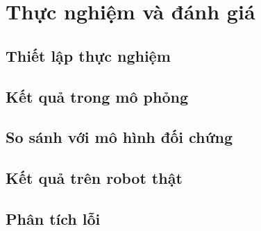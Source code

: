 \section{Thực nghiệm và đánh giá}
\label{sec:experiments}

\subsection{Thiết lập thực nghiệm}

\subsection{Kết quả trong mô phỏng}

\subsection{So sánh với mô hình đối chứng}

\subsection{Kết quả trên robot thật}

\subsection{Phân tích lỗi}
